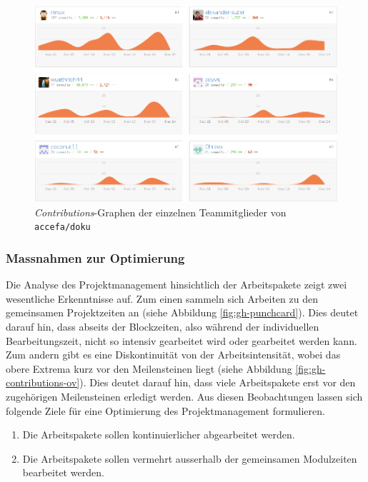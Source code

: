 \begin{figure}[h!]
	\centering
	\includegraphics[width=1\textwidth]{../../fig/pm/gh-contributions-team.png}
	\caption{\emph{Contributions}-Graphen der einzelnen Teammitglieder
		von \lstinline{accefa/doku}}
	\label{fig:gh-contributions-team}
\end{figure}

\subsubsection{Massnahmen zur Optimierung}\label{sec:issue-optize}
Die Analyse des Projektmanagement hinsichtlich der Arbeitspakete zeigt zwei
wesentliche Erkenntnisse auf. Zum einen sammeln sich Arbeiten zu den
gemeinsamen Projektzeiten an (siehe Abbildung \ref{fig:gh-punchcard}).
Dies deutet darauf hin, dass abseits der Blockzeiten, also während der
individuellen Bearbeitungszeit, nicht so intensiv gearbeitet wird oder
gearbeitet werden kann. Zum andern gibt es eine Diskontinuität von der
Arbeitsintensität, wobei das obere Extrema kurz vor den Meilensteinen liegt
(siehe Abbildung \ref{fig:gh-contributions-ov}).
Dies deutet darauf hin, dass viele Arbeitspakete erst vor den zugehörigen
Meilensteinen erledigt werden. Aus diesen Beobachtungen lassen sich
folgende Ziele für eine Optimierung des Projektmanagement formulieren.

\begin{enumerate}
	\item Die Arbeitspakete sollen kontinuierlicher abgearbeitet werden.
	\item Die Arbeitspakete sollen vermehrt ausserhalb der gemeinsamen
		Modulzeiten bearbeitet werden.
\end{enumerate}

